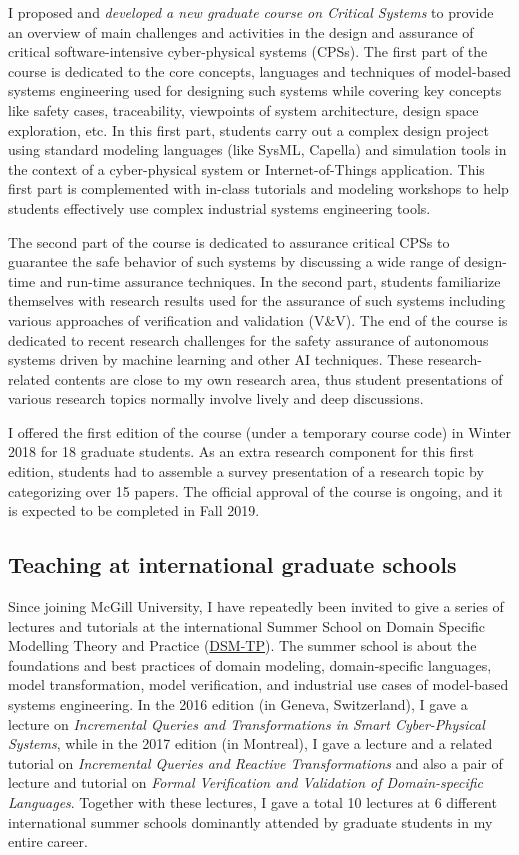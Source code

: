 I proposed and \emph{developed a new graduate course on Critical Systems} to provide an overview of main challenges and activities in the design and assurance of critical software-intensive cyber-physical systems (CPSs). The first part of the course is dedicated to the core concepts, languages and techniques of model-based systems engineering used for designing such systems while covering key concepts like safety cases, traceability, viewpoints of system architecture, design space exploration, etc. In this first part, students carry out a complex design project using standard modeling languages (like SysML, Capella) and simulation tools in the context of a cyber-physical system or Internet-of-Things application. This first part is complemented with in-class tutorials and modeling workshops to help students effectively use complex industrial systems engineering tools.

The second part of the course is dedicated to assurance critical CPSs to guarantee the safe behavior of such systems by discussing a wide range of design-time and run-time assurance techniques. In the second part, students familiarize themselves with research results used for the assurance of such systems including various approaches of verification and validation (V\&V). The end of the course is dedicated to recent research challenges for the safety assurance of autonomous systems driven by machine learning and other AI techniques. These research-related contents are close to my own research area, thus student presentations of various research topics normally involve lively and deep discussions. 

I offered the first edition of the course (under a temporary course code) in Winter 2018 for 18 graduate students. As an extra research component for this first edition, students had to assemble a survey presentation of a research topic by categorizing over 15 papers. The official approval of the course is ongoing, and it is expected to be completed in Fall 2019. 

\subsection{Teaching at international graduate schools}
Since joining McGill University, I have repeatedly been invited to give a series of lectures and tutorials at the international Summer School on Domain Specific Modelling Theory and Practice (\href{http://msdl.cs.mcgill.ca/conferences/dsm-tp-2017}{DSM-TP}). The summer school is about the foundations and best practices of domain modeling, domain-specific languages, model transformation, model verification, and industrial use cases of model-based systems engineering. In the 2016 edition (in Geneva, Switzerland), I gave a lecture on \emph{Incremental Queries and Transformations in Smart Cyber-Physical Systems}, while in the 2017 edition (in Montreal), I gave a lecture and a related tutorial on \emph{Incremental Queries and Reactive Transformations} and also a pair of lecture and tutorial on \emph{Formal Verification and Validation of Domain-specific Languages}. Together with these lectures, I gave a total 10 lectures at 6 different international summer schools dominantly attended by graduate students in my entire career.


